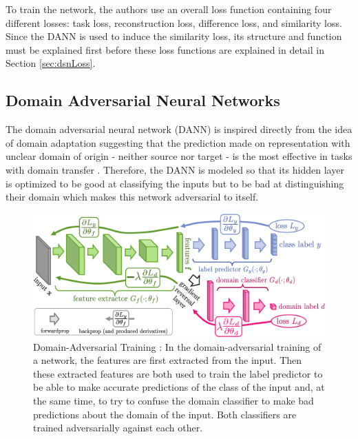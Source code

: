 To train the network, the authors use an overall loss function containing four different losses: task loss, reconstruction loss, difference loss, and similarity loss. Since the DANN is used to induce the similarity loss, its structure and function must be explained first before these loss functions are explained in detail in Section \ref{sec:dsnLoss}.

\subsection{Domain Adversarial Neural Networks} \label{sec:dann}
The domain adversarial neural network (DANN) \cite{dannGanin} is inspired directly from the idea of domain adaptation suggesting that the prediction made on representation with unclear domain of origin - neither source nor target - is the most effective in tasks with domain transfer \cite{DArepres}. Therefore, the DANN is modeled so that its hidden layer is optimized to be good at classifying the inputs but to be bad at distinguishing their domain which makes this network adversarial to itself. 

\begin{figure}[tbh]
  \centering
    \includegraphics[width=\textwidth]{abbildungen/dann.png}
  \caption{Domain-Adversarial Training \cite{dannGanin}: In the domain-adversarial training of a network, the features are first extracted from the input. Then these extracted features are both used to train the label predictor to be able to make accurate predictions of the class of the input and, at the same time, to try to confuse the domain classifier to make bad predictions about the domain of the input. Both classifiers are trained adversarially against each other.}
  \label{fig:dann}
\end{figure}

